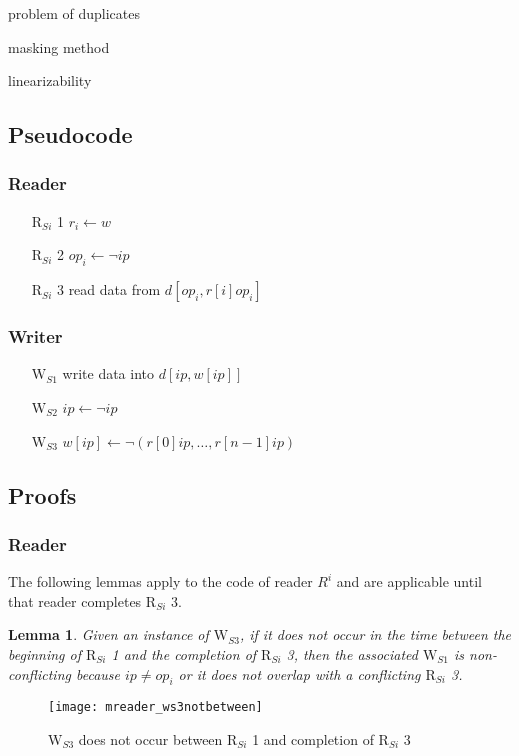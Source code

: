 \documentclass{article}
\newtheorem{lemma}{Lemma}
\newcommand\paren[1]{\left({#1}\right)}
\newcommand\RS[1]{\ensuremath{\text{R}_{S#1}}}
\newcommand\WS[1]{\ensuremath{\text{W}_{S#1}}}
\newcommand\W[1]{\ensuremath{w\left[#1\right]}}
\newcommand\R[1]{\ensuremath{r\left[#1\right]}}
\newcommand\data[1]{\ensuremath{d\left[#1\right]}}
\newcommand\ip{\ensuremath{ip}}
\newcommand\op{\ensuremath{op}}
\newcommand\gneg[1]{\neg\paren{#1}}
\begin{document}
problem of duplicates

masking method

linearizability

\subsection{Pseudocode}
\subsubsection{Reader}
\begin{itemize}
\item[\RS i 1] $r_i\gets w$
\item[\RS i 2] $\op_i\gets\neg\ip$
\item[\RS i 3] read data from $\data{\op_i,\R i {\op_i}}$
\end{itemize}

\subsubsection{Writer}
\begin{itemize}
\item[\WS 1] write data into $\data{\ip,\W{\ip}}$
\item[\WS 2] $\ip\gets\neg\ip$
\item[\WS 3] $\W{\ip}\gets\gneg{\R 0 {\ip}, \ldots, \R {n - 1} {\ip}}$
\end{itemize}


\subsection{Proofs}
\subsubsection{Reader}

The following lemmas apply to the code of reader $R^i$ and are
applicable until that reader completes \RS i 3.

\begin{lemma}\label{lma:mws3notbetween}
  Given an instance of \WS3, if it does not occur in the time between
  the beginning of \RS i 1 and the completion of \RS i 3, then the
  associated \WS1 is non-conflicting because $\ip\neq\op_i$ or it does
  not overlap with a conflicting \RS i 3.
\end{lemma}

\begin{figure*}[h]
  \centering
  \texttt{[image: mreader\_ws3notbetween]}
  \caption{\WS 3 does not occur between \RS i 1 and completion of \RS i 3}
  \label{fig:mrws3nb}
\end{figure*}
\end{document}
